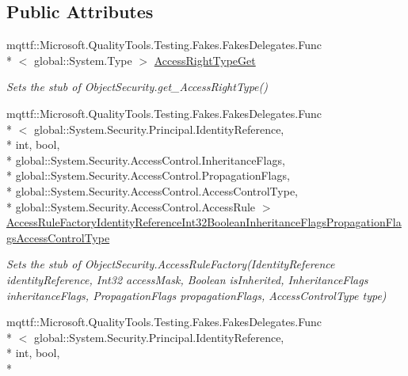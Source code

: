 \subsection*{Public Attributes}
\begin{DoxyCompactItemize}
\item 
mqttf\-::\-Microsoft.\-Quality\-Tools.\-Testing.\-Fakes.\-Fakes\-Delegates.\-Func\\*
$<$ global\-::\-System.\-Type $>$ \hyperlink{class_system_1_1_security_1_1_access_control_1_1_fakes_1_1_stub_directory_object_security_ae98c4b5e7d849d550ae172807f437976}{Access\-Right\-Type\-Get}
\begin{DoxyCompactList}\small\item\em Sets the stub of Object\-Security.\-get\-\_\-\-Access\-Right\-Type()\end{DoxyCompactList}\item 
mqttf\-::\-Microsoft.\-Quality\-Tools.\-Testing.\-Fakes.\-Fakes\-Delegates.\-Func\\*
$<$ global\-::\-System.\-Security.\-Principal.\-Identity\-Reference, \\*
int, bool, \\*
global\-::\-System.\-Security.\-Access\-Control.\-Inheritance\-Flags, \\*
global\-::\-System.\-Security.\-Access\-Control.\-Propagation\-Flags, \\*
global\-::\-System.\-Security.\-Access\-Control.\-Access\-Control\-Type, \\*
global\-::\-System.\-Security.\-Access\-Control.\-Access\-Rule $>$ \hyperlink{class_system_1_1_security_1_1_access_control_1_1_fakes_1_1_stub_directory_object_security_a1e0d2cf6b3b64f66196d9aefeb5da5fe}{Access\-Rule\-Factory\-Identity\-Reference\-Int32\-Boolean\-Inheritance\-Flags\-Propagation\-Flags\-Access\-Control\-Type}
\begin{DoxyCompactList}\small\item\em Sets the stub of Object\-Security.\-Access\-Rule\-Factory(\-Identity\-Reference identity\-Reference, Int32 access\-Mask, Boolean is\-Inherited, Inheritance\-Flags inheritance\-Flags, Propagation\-Flags propagation\-Flags, Access\-Control\-Type type)\end{DoxyCompactList}\item 
mqttf\-::\-Microsoft.\-Quality\-Tools.\-Testing.\-Fakes.\-Fakes\-Delegates.\-Func\\*
$<$ global\-::\-System.\-Security.\-Principal.\-Identity\-Reference, \\*
int, bool, \\*

\end{DoxyCompactItemize}
